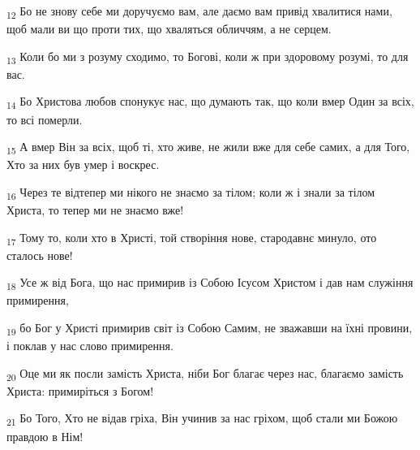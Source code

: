 \begin{tcolorbox}
\textsubscript{12} Бо не знову себе ми доручуємо вам, але даємо вам привід хвалитися нами, щоб мали ви що проти тих, що хваляться обличчям, а не серцем.
\end{tcolorbox}
\begin{tcolorbox}
\textsubscript{13} Коли бо ми з розуму сходимо, то Богові, коли ж при здоровому розумі, то для вас.
\end{tcolorbox}
\begin{tcolorbox}
\textsubscript{14} Бо Христова любов спонукує нас, що думають так, що коли вмер Один за всіх, то всі померли.
\end{tcolorbox}
\begin{tcolorbox}
\textsubscript{15} А вмер Він за всіх, щоб ті, хто живе, не жили вже для себе самих, а для Того, Хто за них був умер і воскрес.
\end{tcolorbox}
\begin{tcolorbox}
\textsubscript{16} Через те відтепер ми нікого не знаємо за тілом; коли ж і знали за тілом Христа, то тепер ми не знаємо вже!
\end{tcolorbox}
\begin{tcolorbox}
\textsubscript{17} Тому то, коли хто в Христі, той створіння нове, стародавнє минуло, ото сталось нове!
\end{tcolorbox}
\begin{tcolorbox}
\textsubscript{18} Усе ж від Бога, що нас примирив із Собою Ісусом Христом і дав нам служіння примирення,
\end{tcolorbox}
\begin{tcolorbox}
\textsubscript{19} бо Бог у Христі примирив світ із Собою Самим, не зважавши на їхні провини, і поклав у нас слово примирення.
\end{tcolorbox}
\begin{tcolorbox}
\textsubscript{20} Оце ми як посли замість Христа, ніби Бог благає через нас, благаємо замість Христа: примиріться з Богом!
\end{tcolorbox}
\begin{tcolorbox}
\textsubscript{21} Бо Того, Хто не відав гріха, Він учинив за нас гріхом, щоб стали ми Божою правдою в Нім!
\end{tcolorbox}
